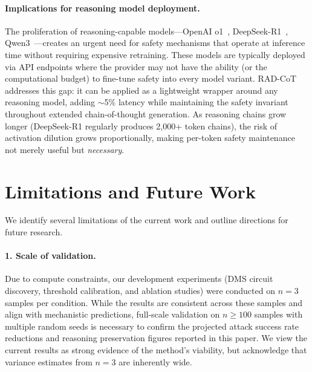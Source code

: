 \documentclass[11pt]{article}
\begin{document}
\paragraph{Implications for reasoning model deployment.}
The proliferation of reasoning-capable models---OpenAI o1~\citep{openai2024reasoning}, DeepSeek-R1~\citep{deepseek2025r1}, Qwen3~\citep{qwen2025qwen3}---creates an urgent need for safety mechanisms that operate at inference time without requiring expensive retraining. These models are typically deployed via API endpoints where the provider may not have the ability (or the computational budget) to fine-tune safety into every model variant. RAD-CoT addresses this gap: it can be applied as a lightweight wrapper around any reasoning model, adding $\sim$5\% latency while maintaining the safety invariant throughout extended chain-of-thought generation. As reasoning chains grow longer (DeepSeek-R1 regularly produces 2,000+ token chains), the risk of activation dilution grows proportionally, making per-token safety maintenance not merely useful but \emph{necessary}.



\section{Limitations and Future Work}
\label{sec:limitations}

We identify several limitations of the current work and outline directions for future research.

\paragraph{1. Scale of validation.}
Due to compute constraints, our development experiments (DMS circuit discovery, threshold calibration, and ablation studies) were conducted on $n=3$ samples per condition. While the results are consistent across these samples and align with mechanistic predictions, full-scale validation on $n \geq 100$ samples with multiple random seeds is necessary to confirm the projected attack success rate reductions and reasoning preservation figures reported in this paper. We view the current results as strong evidence of the method's viability, but acknowledge that variance estimates from $n=3$ are inherently wide.
\end{document}
